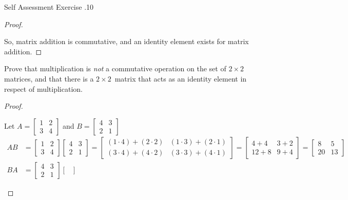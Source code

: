 \documentclass[\main/notes.tex]{subfiles}
\begin{document}
\begin{exercise}{Self Assessment Exercise \thechapter.10}
\begin{questions}
\begin{answer}
\begin{proof}
\begin{subproof}[Identity]
									\end{subproof}
									So, matrix addition is commutative, and an identity element exists for matrix addition.
								\end{proof}
							\end{answer}
						\item Prove that multiplication is \emph{not} a commutative operation on the set of $2 \times 2$ matrices, and that there is a $2 \times 2$~matrix that acts as an identity element in respect of multiplication.
							\begin{answer}
								\begin{proof}
									$ $
									\begin{subproof} Let 
										$A = \begin{bmatrix}1 & 2\\ 3 & 4
									\end{bmatrix}$ and $B = \begin{bmatrix}4 & 3 \\ 2 & 1\end{bmatrix}$
										\begin{align*}
											AB &= \begin{bmatrix}
												1 & 2 \\ 3 & 4
											\end{bmatrix}\begin{bmatrix}
												4 & 3 \\ 2 & 1
											\end{bmatrix} = \begin{bmatrix}
												(1 \cdot 4) + (2 \cdot 2) & (1 \cdot 3) + (2 \cdot 1)\\
												(3 \cdot 4) + (4 \cdot 2) & (3 \cdot 3) + (4 \cdot 1)
											\end{bmatrix} = \begin{bmatrix}
												4 + 4 & 3 + 2\\
												12 + 8 & 9 + 4
											\end{bmatrix} = \begin{bmatrix}
												8 & 5\\
												20 & 13
											\end{bmatrix}\\
											BA &= \begin{bmatrix}
												4 & 3 \\ 2 & 1
											\end{bmatrix} \begin{bmatrix}

\end{bmatrix}
\end{align*}
\end{subproof}
\end{proof}
\end{answer}
\end{questions}
\end{exercise}
\end{document}
